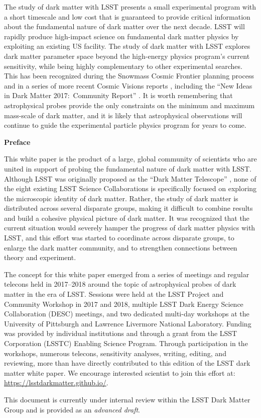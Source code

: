 The study of dark matter with LSST presents a small experimental program with a short timescale and low cost that is guaranteed to provide critical information about the fundamental nature of dark matter over the next decade.
LSST will rapidly produce high-impact science on fundamental dark matter physics by exploiting an existing US facility. 
The study of dark matter with LSST explores dark matter parameter space beyond the high-energy physics program's current sensitivity, while being highly complementary to other experimental searches. %
This has been recognized during the Snowmass Cosmic Frontier planning process \citep[\eg,][]{1305.1605, 1310.8642, 1310.5662} and in a series of more recent Cosmic Visions reports \citep[\eg,][]{1604.07626,1802.07216}, including the ``New Ideas in Dark Matter 2017:\ Community Report'' \citep{1707.04591}.
It is worth remembering that astrophysical probes provide the only constraints on the minimum and maximum mass-scale of dark matter, and it is likely that astrophysical observations will continue to guide the  experimental particle physics program for years to come.

\clearpage

\begin{center}
  {\Large \bf Preface}
\end{center}

This white paper is the product of a large, global community of scientists who are united in support of probing the fundamental nature of dark matter with LSST.
Although LSST was originally proposed as the ``Dark Matter Telescope'' \citep{Tyson:2001}, none of the eight existing LSST Science Collaborations is specifically focused on exploring the microscopic identity of dark matter.
Rather, the study of dark matter is distributed across several disparate groups, making it difficult to combine results and build a cohesive physical picture of dark matter.
It was recognized that the current situation would severely hamper the progress of dark matter physics with LSST, and this effort was started to coordinate across disparate groups, to enlarge the dark matter community, and to strengthen connections between theory and experiment.

The concept for this white paper emerged from a series of meetings and regular telecons held in 2017--2018 around the topic of astrophysical probes of dark matter in the era of LSST.
Sessions were held at the LSST Project and Community Workshop in 2017 and 2018, multiple LSST Dark Energy Science Collaboration (DESC) meetings, and two dedicated multi-day workshops at the University of Pittsburgh and Lawrence Livermore National Laboratory.
Funding was provided by individual institutions and through a grant from the LSST Corporation (LSSTC) Enabling Science Program.
Through participation in the workshops, numerous telecons, sensitivity analyses, writing, editing, and reviewing, more than  have directly contributed to this edition of the LSST dark matter white paper.
We encourage interested scientist to join this effort at: \textcolor{blue}{\url{https://lsstdarkmatter.github.io/}}.

This document is currently under internal review within the LSST Dark Matter Group and is provided as an \emph{advanced draft}.


